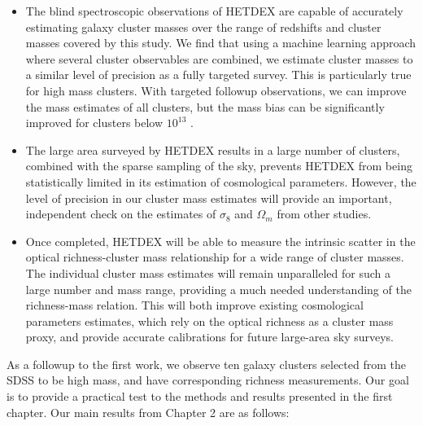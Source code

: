 \begin{itemize}
	\item The blind spectroscopic observations of HETDEX are capable of accurately estimating galaxy cluster masses over the range of redshifts and cluster masses covered by this study. We find that using a machine learning approach where several cluster observables are combined, we estimate cluster masses to a similar level of precision as a fully targeted survey. This is particularly true for high mass clusters. With targeted followup observations, we can improve the mass estimates of all clusters, but the mass bias can be significantly improved for clusters below $10^{13}$ \Msol.
	
	\item The large area surveyed by HETDEX results in a large number of clusters, combined with the sparse sampling of the sky, prevents HETDEX from being statistically limited in its estimation of cosmological parameters. However, the level of precision in our cluster mass estimates will provide an important, independent check on the estimates of $\sigma_8$ and $\Omega_m$ from other studies.
	
	\item Once completed, HETDEX will be able to measure the intrinsic scatter in the optical richness-cluster mass relationship for a wide range of cluster masses. The individual cluster mass estimates will remain unparalleled for such a large number and mass range, providing a much needed understanding of the richness-mass relation. This will both improve existing cosmological parameters estimates, which rely on the optical richness as a cluster mass proxy, and provide accurate calibrations for future large-area sky surveys.  
\end{itemize}

As a followup to the first work, we observe ten galaxy clusters selected from the SDSS to be high mass, and have corresponding richness measurements. Our goal is to provide a practical test to the methods and results presented in the first chapter. Our main results from Chapter 2 are as follows:

